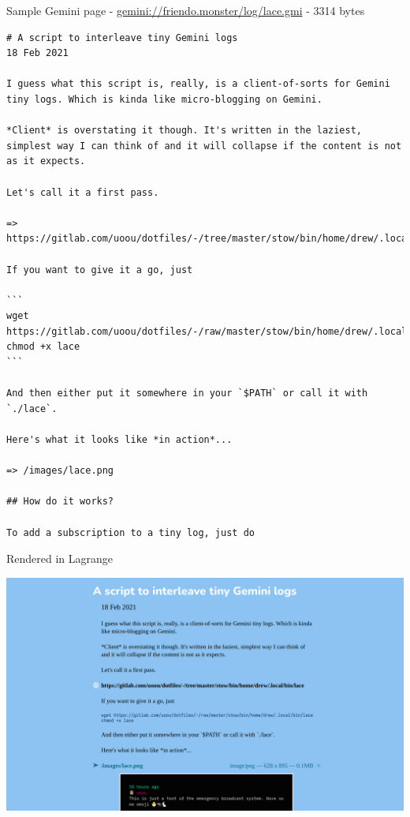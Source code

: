 \documentclass[presentation, 11pt,  aspectratio=169]{beamer}
\begin{document}
\begin{frame}[label={sec:org714b87a},fragile]{Sample Gemini page - \href{gemini://friendo.monster/log/lace.gmi}{gemini://friendo.monster/log/lace.gmi} - 3314 bytes}
 \begin{scriptsize}
\begin{verbatim}
# A script to interleave tiny Gemini logs
18 Feb 2021

I guess what this script is, really, is a client-of-sorts for Gemini tiny logs. Which is kinda like micro-blogging on Gemini.

*Client* is overstating it though. It's written in the laziest, simplest way I can think of and it will collapse if the content is not as it expects.

Let's call it a first pass.

=> https://gitlab.com/uoou/dotfiles/-/tree/master/stow/bin/home/drew/.local/bin/lace

If you want to give it a go, just

```
wget https://gitlab.com/uoou/dotfiles/-/raw/master/stow/bin/home/drew/.local/bin/lace
chmod +x lace
```

And then either put it somewhere in your `$PATH` or call it with `./lace`.

Here's what it looks like *in action*...

=> /images/lace.png

## How do it works?

To add a subscription to a tiny log, just do
\end{verbatim}
\end{scriptsize}
\end{frame}

\begin{frame}[label={sec:org5afd7ce}]{Rendered in Lagrange}
\begin{center}
\includegraphics[width=.9\linewidth]{images/gemini-sample-friendo.monster.png}
\end{center}
\end{frame}
\end{document}
